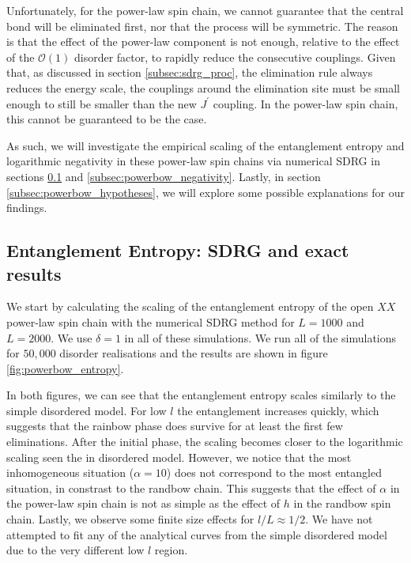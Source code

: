 Unfortunately, for the power-law spin chain, we cannot guarantee that the central bond will be eliminated first, nor that the process will be symmetric. The reason is that the effect of the power-law component is not enough, relative to the effect of the $\mathcal{O}(1)$ disorder factor, to rapidly reduce the consecutive couplings. Given that, as discussed in section \ref{subsec:sdrg_proc}, the elimination rule always reduces the energy scale, the couplings around the elimination site must be small enough to still be smaller than the new $J^\prime$ coupling. In the power-law spin chain, this cannot be guaranteed to be the case.

As such, we will investigate the empirical scaling of the entanglement entropy and logarithmic negativity in these power-law spin chains via numerical SDRG in sections \ref{subsec:powerbow_sdrg} and \ref{subsec:powerbow_negativity}. Lastly, in section \ref{subsec:powerbow_hypotheses}, we will explore some possible explanations for our findings.

\subsection{Entanglement Entropy: SDRG and exact results}\label{subsec:powerbow_sdrg}
We start by calculating the scaling of the entanglement entropy of the open $XX$ power-law spin chain with the numerical SDRG method for $L = 1000$ and $L = 2000$. We use $\delta = 1$ in all of these simulations. We run all of the simulations for $50,000$ disorder realisations and the results are shown in figure \ref{fig:powerbow_entropy}. 

In both figures, we can see that the entanglement entropy scales similarly to the simple disordered model. For low $l$ the entanglement increases quickly, which suggests that the rainbow phase does survive for at least the first few eliminations. After the initial phase, the scaling becomes closer to the logarithmic scaling seen the in disordered model. However, we notice that the most inhomogeneous situation ($\alpha = 10$) does not correspond to the most entangled situation, in constrast to the randbow chain. This suggests that the effect of $\alpha$ in the power-law spin chain is not as simple as the effect of $h$ in the randbow spin chain. Lastly, we observe some finite size effects for $l / L \approx 1/2$. We have not attempted to fit any of the analytical curves from the simple disordered model due to the very different low $l$ region.

